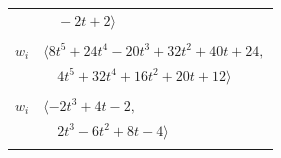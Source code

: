 \documentclass[11pt]{article}
\begin{document}
\begin{longtable}{@{}ll@{}}
 & $\quad -2t+2\rangle$\\
\addlinespace[2pt]
\multicolumn{2}{@{}p{0.97\textwidth}@{}}{$i=30$, $D_i=10$, $\rho_{ij}$: $6{:}1, \allowbreak 10{:}1, \allowbreak 12{:}1, \allowbreak 17{:}1, \allowbreak 18{:}1, \allowbreak 25{:}1, \allowbreak 26{:}2$}\\
$w_i$ & $\langle 8t^{5}+24t^{4}-20t^{3}+32t^{2}+40t+24,$\\
 & $\quad 4t^{5}+32t^{4}+16t^{2}+20t+12\rangle$\\
\addlinespace[2pt]
\multicolumn{2}{@{}p{0.97\textwidth}@{}}{$i=31$, $D_i=2$, $\rho_{ij}$: $5{:}2, \allowbreak 21{:}2, \allowbreak 24{:}1, \allowbreak 26{:}1$}\\
$w_i$ & $\langle -2t^{3}+4t-2,$\\
 & $\quad 2t^{3}-6t^{2}+8t-4\rangle$\\
\addlinespace[2pt]
\end{longtable}
\endgroup
\end{document}
